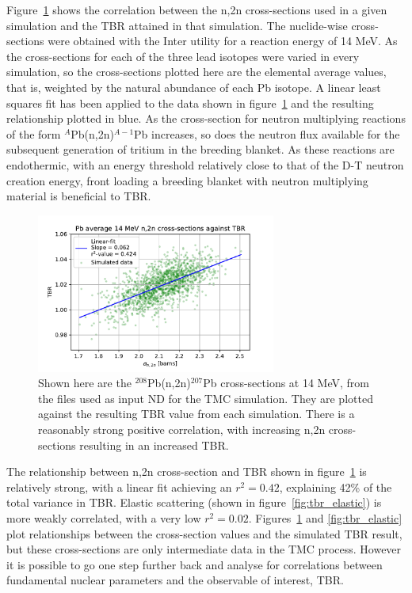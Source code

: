 Figure~\ref{fig:tbr_n2n} shows the correlation between the n,2n cross-sections used in a given simulation and the TBR attained in that simulation. The nuclide-wise cross-sections were obtained with the Inter utility for a reaction energy of 14 MeV. As the cross-sections for each of the three lead isotopes were varied in every simulation, so the cross-sections plotted here are the elemental average values, that is, weighted by the natural abundance of each Pb isotope. A linear least squares fit has been applied to the data shown in figure~\ref{fig:tbr_n2n} and the resulting relationship plotted in blue. As the cross-section for neutron multiplying reactions of the form $^{A}$Pb(n,2n)$^{A-1}$Pb increases, so does the neutron flux available for the subsequent generation of tritium in the breeding blanket. As these reactions are endothermic, with an energy threshold relatively close to that of the D-T neutron creation energy, front loading a breeding blanket with neutron multiplying material is beneficial to TBR.

\begin{figure}[H]
  \centering
	\includegraphics[width=0.7\textwidth]{TBR_n,2n}
	\caption[Correlation between $^{208}$Pb(n,2n)$^{207}$Pb cross-sections and TBR.]{Shown here are the $^{208}$Pb(n,2n)$^{207}$Pb cross-sections at 14 MeV, from the files used as input ND for the TMC simulation. They are plotted against the resulting TBR value from each simulation. There is a reasonably strong positive correlation, with increasing n,2n cross-sections resulting in an increased TBR.}
	\label{fig:tbr_n2n}
\end{figure}

The relationship between n,2n cross-section and TBR shown in figure~\ref{fig:tbr_n2n} is relatively strong, with a linear fit achieving an $r^{2}=0.42$, explaining 42\% of the total variance in TBR. Elastic scattering (shown in figure~\ref{fig:tbr_elastic}) is more weakly correlated, with a very low $r^{2}=0.02$. Figures~\ref{fig:tbr_n2n} and \ref{fig:tbr_elastic} plot relationships between the cross-section values and the simulated TBR result, but these cross-sections are only intermediate data in the TMC process. However it is possible to go one step further back and analyse for correlations between fundamental nuclear parameters and the observable of interest, TBR. 


